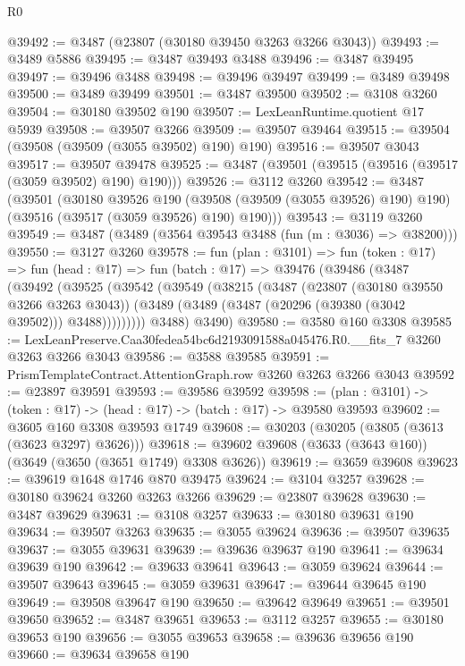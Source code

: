 \begin{lexlean}{R0}
\begin{coremodule}
@39492 := @3487 (@23807 (@30180 @39450 @3263 @3266 @3043))
@39493 := @3489 @5886
@39495 := @3487 @39493 @3488
@39496 := @3487 @39495
@39497 := @39496 @3488
@39498 := @39496 @39497
@39499 := @3489 @39498
@39500 := @3489 @39499
@39501 := @3487 @39500
@39502 := @3108 @3260
@39504 := @30180 @39502 @190
@39507 := LexLeanRuntime.quotient @17 @5939
@39508 := @39507 @3266
@39509 := @39507 @39464
@39515 := @39504 (@39508 (@39509 (@3055 @39502) @190) @190)
@39516 := @39507 @3043
@39517 := @39507 @39478
@39525 := @3487 (@39501 (@39515 (@39516 (@39517 (@3059 @39502) @190) @190)))
@39526 := @3112 @3260
@39542 := @3487
    (@39501
      (@30180
        @39526
        @190
        (@39508 (@39509 (@3055 @39526) @190) @190)
        (@39516 (@39517 (@3059 @39526) @190) @190)))
@39543 := @3119 @3260
@39549 := @3487 (@3489 (@3564 @39543 @3488 (fun (m : @3036) => @38200)))
@39550 := @3127 @3260
@39578 := fun (plan : @3101) =>
  fun (token : @17) =>
  fun (head : @17) =>
  fun (batch : @17) =>
  @39476
    (@39486
      (@3487
        (@39492
          (@39525
            (@39542
              (@39549
                (@38215
                  (@3487
                    (@23807 (@30180 @39550 @3266 @3263 @3043))
                    (@3489 (@3489 (@3487 (@20296 (@39380 (@3042 @39502))) @3488)))))))))
        @3488)
      @3490)
@39580 := @3580 @160 @3308
@39585 := LexLeanPreserve.Caa30fedea54bc6d2193091588a045476.R0.__fits_7 @3260 @3263 @3266 @3043
@39586 := @3588 @39585
@39591 := PrismTemplateContract.AttentionGraph.row @3260 @3263 @3266 @3043
@39592 := @23897 @39591
@39593 := @39586 @39592
@39598 := (plan : @3101) -> (token : @17) -> (head : @17) -> (batch : @17) -> @39580 @39593
@39602 := @3605 @160 @3308 @39593 @1749
@39608 := @30203 (@30205 (@3805 (@3613 (@3623 @3297) @3626)))
@39618 := @39602 @39608 (@3633 (@3643 @160)) (@3649 (@3650 (@3651 @1749) @3308 @3626))
@39619 := @3659 @39608
@39623 := @39619 @1648 @1746 @870 @39475
@39624 := @3104 @3257
@39628 := @30180 @39624 @3260 @3263 @3266
@39629 := @23807 @39628
@39630 := @3487 @39629
@39631 := @3108 @3257
@39633 := @30180 @39631 @190
@39634 := @39507 @3263
@39635 := @3055 @39624
@39636 := @39507 @39635
@39637 := @3055 @39631
@39639 := @39636 @39637 @190
@39641 := @39634 @39639 @190
@39642 := @39633 @39641
@39643 := @3059 @39624
@39644 := @39507 @39643
@39645 := @3059 @39631
@39647 := @39644 @39645 @190
@39649 := @39508 @39647 @190
@39650 := @39642 @39649
@39651 := @39501 @39650
@39652 := @3487 @39651
@39653 := @3112 @3257
@39655 := @30180 @39653 @190
@39656 := @3055 @39653
@39658 := @39636 @39656 @190
@39660 := @39634 @39658 @190

\end{coremodule}
\end{lexlean}

